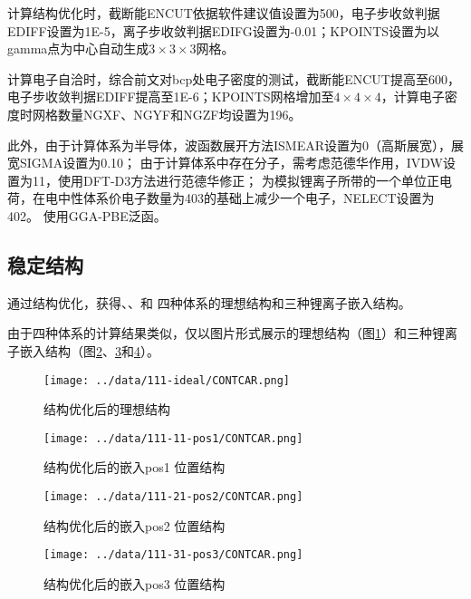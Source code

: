 计算结构优化时，截断能ENCUT依据软件建议值设置为500，电子步收敛判据EDIFF设置为1E-5，离子步收敛判据EDIFG设置为-0.01；KPOINTS设置为以gamma点为中心自动生成$3\times3\times3$网格。

计算电子自洽时，综合前文对bcp处电子密度的测试，截断能ENCUT提高至600，电子步收敛判据EDIFF提高至1E-6；KPOINTS网格增加至$4\times4\times4$，计算电子密度时网格数量NGXF、NGYF和NGZF均设置为196。

此外，由于计算体系为半导体，波函数展开方法ISMEAR设置为0（高斯展宽），展宽SIGMA设置为0.10；
由于计算体系中存在分子，需考虑范德华作用，IVDW设置为11，使用DFT-D3方法进行范德华修正；
为模拟锂离子所带的一个单位正电荷，在电中性体系价电子数量为403的基础上减少一个电子，NELECT设置为402。
使用GGA-PBE泛函。

\subsection{稳定结构}

通过结构优化，获得、、和 四种体系的理想结构和三种锂离子嵌入结构。

由于四种体系的计算结果类似，仅以图片形式展示的理想结构（图\ref{fig:111-ideal-contcar}）和三种锂离子嵌入结构（图\ref{fig:111-11-pos1-contcar}、\ref{fig:111-21-pos2-contcar}和\ref{fig:111-31-pos3-contcar}）。

\begin{figure}[htbp]
    \centering
    \texttt{[image: ../data/111-ideal/CONTCAR.png]}
    \caption{结构优化后的理想结构}
    \label{fig:111-ideal-contcar}
\end{figure}
\begin{figure}[htbp]
    \centering
    \texttt{[image: ../data/111-11-pos1/CONTCAR.png]}
    \caption{结构优化后的嵌入pos1 位置结构}
    \label{fig:111-11-pos1-contcar}
\end{figure}
\begin{figure}[htbp]
    \centering
    \texttt{[image: ../data/111-21-pos2/CONTCAR.png]}
    \caption{结构优化后的嵌入pos2 位置结构}
    \label{fig:111-21-pos2-contcar}
\end{figure}
\begin{figure}[htbp]
    \centering
    \texttt{[image: ../data/111-31-pos3/CONTCAR.png]}
    \caption{结构优化后的嵌入pos3 位置结构}
    \label{fig:111-31-pos3-contcar}
\end{figure}

